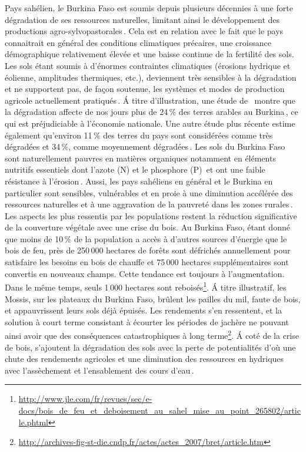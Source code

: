 \documentclass[a4paper,11pt]{article}
\begin{document}
Pays sahélien, le Burkina Faso est soumis depuis plusieurs décennies à
une forte dégradation de ses ressources naturelles, limitant ainsi le
développement des productions
agro-sylvopastorales\,\cite{Thiombiano_2000}. Cela est en relation
avec le fait que le pays connaitrait en général des conditions
climatiques précaires, une croissance démographique relativement
élevée et une baisse continue de la fertilité des sols. Les sols étant
soumis à d'énormes contraintes climatiques (érosions hydrique et
éolienne, amplitudes thermiques, etc.), deviennent très sensibles à la
dégradation et ne supportent pas, de façon soutenue, les systèmes et
modes de production agricole actuellement
pratiqués\,\cite{PANA_2003}. \'{A} titre d'illustration, une étude de
\,\citeauthor{INERA_2003} montre que la dégradation affecte de nos
jours plus de 24\,\% des terres arables au Burkina\,\cite{INERA_2003},
ce qui est préjudiciable à l'économie nationale. Une autre étude plus
récente estime également qu'environ 11\,\% des terres du pays sont
considérées comme très dégradées et 34\,\%, comme moyennement
dégradées\,\cite{SPCONEDD_2006}.  Les sols du Burkina Faso sont
naturellement pauvres en matières organiques notamment en éléments
nutritifs essentiels dont l'azote (N) et le phosphore
(P)\,\cite{Traore_2008} et ont une faible résistance à
l'érosion\,\cite{Berger_1991}. Aussi, les pays sahéliens en général et
le Burkina en particulier sont sensibles, vulnérables et en proie à
une diminution accélérée des ressources naturelles et à une
aggravation de la pauvreté dans les zones
rurales\,\cite{Roose_2004}. Les aspects les plus ressentis par les
populations restent la réduction significative de la couverture
végétale avec une crise du bois. Au Burkina Faso, étant donné que
moins de 10\,\% de la population a accès à d'autres sources d'énergie
que le bois de feu, près de 250\,000 hectares de forêts sont défrichés
annuellement pour satisfaire les besoins en bois de chauffe et 75\,000
hectares supplémentaires sont convertis en nouveaux champs. Cette
tendance est toujours à l'augmentation. Dans le même temps, seuls
1\,000 hectares sont
reboisés\footnote{\url{http://www.jle.com/fr/revues/sec/e-docs/bois_de_feu_et_deboisement_au_sahel_mise_au_point_265802/article.phtml}}. \'{A}
titre illustratif, les Mossis, sur les plateaux du Burkina Faso,
brûlent les pailles du mil, faute de bois, et appauvrissent leurs sols
déjà épuisés. Les rendements s'en ressentent, et la solution à court
terme consistant à écourter les périodes de jachère ne pouvant ainsi
avoir que des conséquences catastrophiques à long
terme\footnote{\url{http://archives-fig-st-die.cndp.fr/actes/actes_2007/bret/article.htm}}.
\'{A} coté de la crise de bois, s'ajoutent la dégradation des sols avec la
perte de potentialités d'où une chute des rendements agricoles et
une diminution des ressources en hydriques avec l'assèchement et
l'ensablement des cours d'eau\,\cite{ZOMBRE_2006}.
\end{document}
